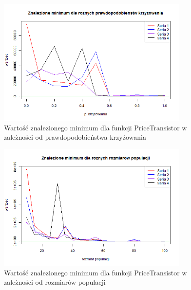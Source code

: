 \documentclass[11pt, a4paper]{article}
\begin{document}
\begin{figure}[H]
	\begin{center}
		\includegraphics[width=0.85\textwidth]{./assets/PriceTransistor3.png}
		\caption{Wartość znalezionego minimum dla funkcji PriceTransistor w zależności od prawdopodobieństwa krzyżowania}
		\label{fig:pricetransistor3}
	\end{center}
\end{figure}

\begin{figure}[H]
	\begin{center}
		\includegraphics[width=0.85\textwidth]{./assets/PriceTransistor4.png}
		\caption{Wartość znalezionego minimum dla funkcji PriceTransistor w zależności od rozmiarów populacji}
		\label{fig:pricetransistor4}
	\end{center}
\end{figure}
\end{document}
